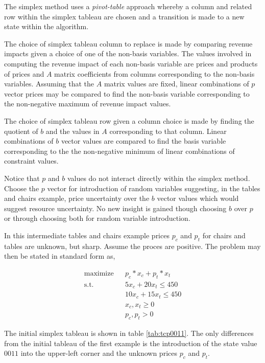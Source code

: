 The simplex method uses a \emph{pivot-table} approach whereby a column and related row within the simplex tableau are chosen and a transition is made to a new state within the algorithm. 

The choice of simplex tableau column to replace is made by comparing revenue impacts given a choice of one of the non-basis variables. The values involved in computing the revenue impact of each non-basis variable are prices and products of prices and $A$ matrix coefficients from columns corresponding to the non-basis variables. Assuming that the $A$ matrix values are fixed, linear combinations of $p$ vector prices may be compared to find the  non-basis variable corresponding to the non-negative maximum of revenue impact values.

The choice of simplex tableau row given a column choice is made by finding the quotient of $b$ and the values in $A$ corresponding to that column. Linear combinations of $b$ vector values are compared to find the basis variable corresponding to the the non-negative minimum of linear combinations of constraint values.

Notice that $p$ and $b$ values do not interact directly within the simplex method. Choose the $p$ vector for introduction of random variables suggesting, in the tables and chairs example, price uncertainty over the $b$ vector values which would suggest resource uncertainty. No new insight is gained though choosing $b$ over $p$ or through choosing both for random variable introduction.

In this intermediate tables and chairs example prices $p_c$ and $p_t$ for chairs and tables are unknown, but sharp. Assume the proces are positive. The problem may then be stated in standard form as,

\begin{align*}
\text{maximize} && p_c * x_c + p_t * x_t\\
\text{s.t.}     && 5 x_c + 20 x_t \le 450\\
                && 10 x_c + 15 x_t \le 450\\
                && x_c, x_t \ge 0\\
                && p_c, p_t > 0
\end{align*}

The initial simplex tableau is shown in table \ref{tab:tcp0011}. The only differences from the initial tableau of the first example is the introduction of the state value $0011$ into the upper-left corner and the unknown prices $p_c$ and $p_t$.

